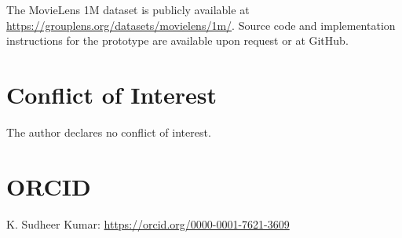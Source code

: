 \documentclass[acmsmall]{acmart}
\begin{document}
The MovieLens 1M dataset is publicly available at \url{https://grouplens.org/datasets/movielens/1m/}. Source code and implementation instructions for the prototype are available upon request or at GitHub.

\section*{Conflict of Interest}

The author declares no conflict of interest.

\section*{ORCID}

K. Sudheer Kumar: \url{https://orcid.org/0000-0001-7621-3609}  %
\end{document}
